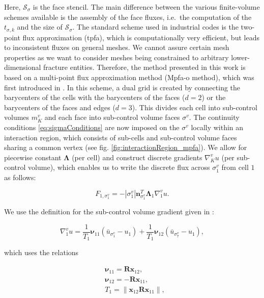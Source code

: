 Here, $\mathcal{S}_\sigma$ is the face stencil. The main difference between the various finite-volume schemes available is the assembly of the face fluxes, i.e.\ the computation of the $t_{\sigma, k}$ and the size of $\mathcal{S}_\sigma$. The standard scheme used in industrial codes is the two-point flux approximation (tpfa), which is computationally very efficient, but leads to inconsistent fluxes on general meshes. We cannot assure certain mesh properties as we want to consider meshes being constrained to arbitrary lower-dimensional fracture entities. Therefore, the method presented in this work is based on a multi-point flux approximation method (Mpfa-o method), which was first introduced in \citet{Aavatsmark2002}. In this scheme, a dual grid is created by connecting the barycenters of the cells with the barycenters of the faces ($d=2$) or the barycenters of the faces and edges ($d=3$). This divides each cell into sub-control volumes $m^v_K$ and each face into sub-control volume faces $\sigma^v$. The continuity conditions \eqref{eq:sigmaConditions} are now imposed on the $\sigma^v$ locally within an interaction region, which consists of sub-cells and sub-control volume faces sharing a common vertex (see fig. \ref{fig:interactionRegion_mpfa}). We allow for piecewise constant $\mathbf{\Lambda}$ (per cell) and construct discrete gradients $\nabla_K^v u$ (per sub-control volume), which enables us to write the discrete flux across $\sigma^v_1$ from cell $1$ as follows:

\begin{equation}
    F_{1, \sigma^v_1} = - |\sigma^v_1| \mathbf{n}_{\sigma^v_1}^T \mathbf{\Lambda}_1 \nabla_1^v u.
    \label{eq:discreteFlux}
\end{equation}

We use the definition for the sub-control volume gradient given in \citet{Aavatsmark2002}:

\begin{equation}
    \nabla_1^v u = \frac{1}{T_1} \boldsymbol{\nu}_{11} (\bar{u}_{\sigma^v_1} - u_1) +
                   \frac{1}{T_1} \boldsymbol{\nu}_{12} (\bar{u}_{\sigma^v_7} - u_1),
\end{equation}

which uses the relations

\begin{equation}
    \begin{aligned}
        &\boldsymbol{\nu}_{11} = \mathbf{R} \mathbf{x}_{12}, \\
        &\boldsymbol{\nu}_{12} = - \mathbf{R} \mathbf{x}_{11}, \\
        &T_1 = \| \mathbf{x}_{12} \mathbf{R} \mathbf{x}_{11} \|,
    \end{aligned}
\end{equation}

